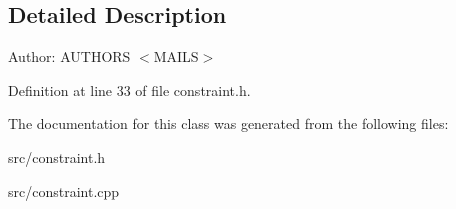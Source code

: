 \subsection{Detailed Description}
\begin{Desc}
\item[Author:]AUTHORS $<$MAILS$>$ \end{Desc}


Definition at line 33 of file constraint.h.

The documentation for this class was generated from the following files:\begin{CompactItemize}
\item 
src/constraint.h\item 
src/constraint.cpp\end{CompactItemize}
